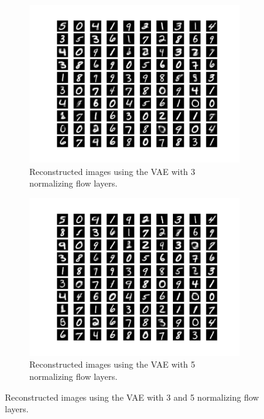 \documentclass{article}
\begin{document}
\begin{figure}[htbp]\hspace{-0.25em}
\begin{subfigure}{0.5\textwidth}
\begin{center}
	\includegraphics[width=\textwidth]{reconstruction_3Layers.png}
\caption{Reconstructed images using the VAE with 3 normalizing flow layers.}
\label{fig:NormFlow3}
\end{center}
\end{subfigure}\hspace{0.5em}
\begin{subfigure}{0.5\textwidth}
\begin{center}
	\includegraphics[width=\textwidth]{reconstruction_5Layers.png}
\caption{Reconstructed images using the VAE with 5 normalizing flow layers.}
\label{fig:NormFlow5}
\end{center}
\end{subfigure}
\caption{Reconstructed images using the VAE with 3 and 5 normalizing flow layers.}
\label{fig:NormFlow35}
\end{figure}
\end{document}
